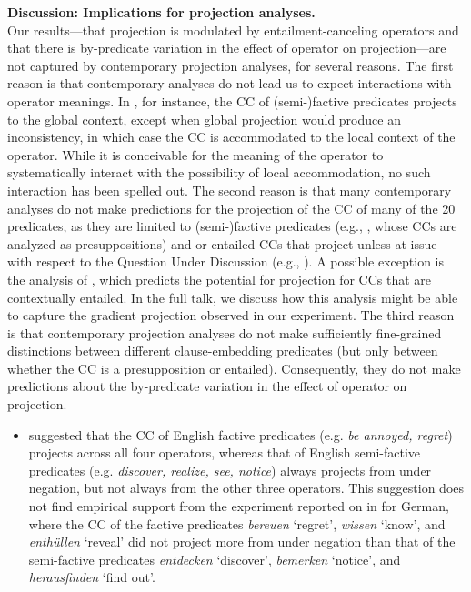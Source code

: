 \documentclass[12pt, letterpaper]{article}
\begin{document}
\noindent
{\bf Discussion:  Implications for projection analyses.}\\
Our results---that projection is modulated by entailment-canceling operators and that there is by-predicate variation in the effect of operator on projection---are not captured by contemporary projection analyses, for several reasons. The first reason is that contemporary analyses do not lead us to expect interactions with operator meanings. In \citealt{heim83}, for instance, the CC of (semi-)factive predicates projects to the global context, except when global projection would produce an inconsistency, in which case the CC is accommodated to the local context of the operator. While it is conceivable for the meaning of the operator to systematically interact with the possibility of local accommodation, no such interaction has been spelled out. The second reason is that many contemporary analyses do not make predictions for the projection of the CC of many of the 20 predicates, as they are limited to (semi-)factive predicates (e.g., \citealt{heim83,vds92}, whose CCs are analyzed as presuppositions) and or entailed CCs that project unless at-issue with respect to the Question Under Discussion (e.g., \citealt{abrusan2011,simons-etal2017}). A possible exception is the analysis of \citealt{schlenker2021}, which predicts the potential for projection for CCs that are contextually entailed. In the full talk, we discuss how this analysis might be able to capture the gradient projection observed in our experiment. The third reason is that contemporary projection analyses do not make sufficiently fine-grained distinctions between different clause-embedding predicates (but only between whether the CC is a presupposition or entailed). Consequently, they do not make predictions about the by-predicate variation in the effect of operator on projection.

\begin{itemize}
	\item \citet{karttunen_observations_1971} suggested that the CC of English factive predicates (e.g. \emph{be annoyed, regret}) projects across all four operators, whereas that of English semi-factive predicates (e.g. \emph{discover, realize, see, notice}) always projects from under negation, but not always from the other three operators. This suggestion does not find empirical support from the experiment reported on in \citealt{siekers-solstad2022} for German, where the CC of the factive predicates \emph{bereuen} `regret', \emph{wissen} `know', and \emph{enth\"ullen} `reveal' did not project more from under negation than that of the semi-factive predicates \emph{entdecken} `discover', \emph{bemerken} `notice', and {\em herausfinden} `find out'. 
\end{itemize}
\end{document}
